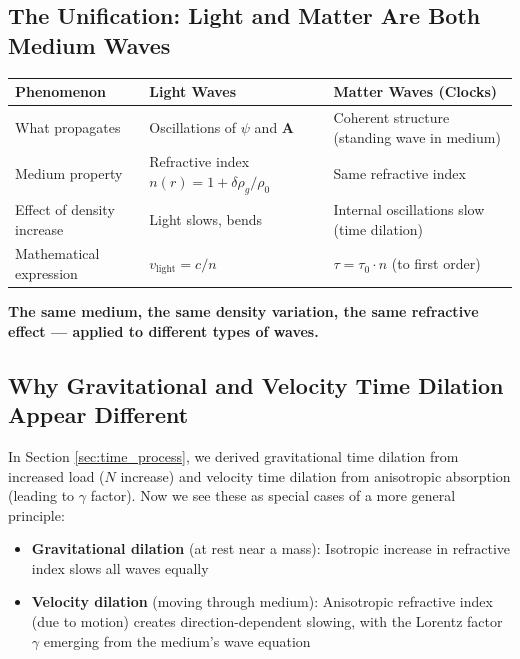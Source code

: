 \documentclass[12pt, a4paper]{article}
\begin{document}
\subsection{The Unification: Light and Matter Are Both Medium Waves}
\label{subsec:light_matter_unification}

\begin{center}
\begin{tabular}{|p{4cm}|p{5cm}|p{5cm}|}
\hline
\textbf{Phenomenon} & \textbf{Light Waves} & \textbf{Matter Waves (Clocks)} \\
\hline
What propagates & Oscillations of \( \psi \) and \( \mathbf{A} \) & Coherent structure (standing wave in medium) \\
\hline
Medium property & Refractive index \( n(r) = 1 + \delta \rho_g/\rho_0 \) & Same refractive index \\
\hline
Effect of density increase & Light slows, bends & Internal oscillations slow (time dilation) \\
\hline
Mathematical expression & \( v_{\text{light}} = c/n \) & \( \tau = \tau_0 \cdot n \) (to first order) \\
\hline
\end{tabular}
\end{center}

\textbf{The same medium, the same density variation, the same refractive effect — applied to different types of waves.}

\subsection{Why Gravitational and Velocity Time Dilation Appear Different}
\label{subsec:dilation_appearance}

In Section \ref{sec:time_process}, we derived gravitational time dilation from increased load (\( N \) increase) and velocity time dilation from anisotropic absorption (leading to \( \gamma \) factor). Now we see these as special cases of a more general principle:

\begin{itemize}
    \item \textbf{Gravitational dilation} (at rest near a mass): Isotropic increase in refractive index slows all waves equally
    \item \textbf{Velocity dilation} (moving through medium): Anisotropic refractive index (due to motion) creates direction-dependent slowing, with the Lorentz factor \( \gamma \) emerging from the medium's wave equation
\end{itemize}
\end{document}
